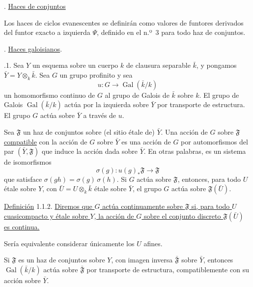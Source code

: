 \pageoriginale

\bigskip
{}. \underline{Haces de conjuntos}

Los haces de ciclos evanescentes se definirán como valores de funtores
derivados del funtor exacto a izquierda $\Psi$, definido en el n.º~3 para
todo haz de conjuntos.

\medskip
{}. \underline{Haces galoisianos}.

\medskip
{}.1. Sea $Y$ un esquema sobre un cuerpo $k$ de clausura separable
$\bar k$, y pongamos $\bar Y=Y\otimes_k\bar k$. Sea $G$ un grupo profinito y
sea
\begin{equation*}
u:G\longrightarrow\operatorname{Gal}(\bar k/k)
\end{equation*}
un homomorfismo continuo de $G$ al grupo de Galois de $\bar k$ sobre $k$. El
grupo de Galois $\operatorname{Gal}(\bar k/k)$ actúa por la izquierda sobre
$\bar Y$ por transporte de estructura. El grupo $G$ actúa sobre $\bar Y$ a
través de $u$.

Sea $\mathfrak F$ un haz de conjuntos sobre (el sitio étale de) $\bar Y$. Una
acción de $G$ sobre $\mathfrak F$ \underline{compatible} con la acción de $G$
sobre $\bar Y$ es una acción de $G$ por automorfismos del par
$(\bar Y,\mathfrak F)$ que induce la acción dada sobre $\bar Y$. En otras
palabras, es un sistema de isomorfismos
\begin{equation*}
\sigma(g):u(g)_*\mathfrak F\longrightarrow\mathfrak F
\end{equation*}
que satisface $\sigma(gh)=\sigma(g)\,\sigma(h)$. Si $G$ actúa sobre
$\mathfrak F$, entonces, para todo $U$ étale sobre $Y$, con
$\bar U=U\otimes_k\bar k$ étale sobre $\bar Y$, el grupo $G$ actúa sobre
$\mathfrak F(\bar U)$.

\medskip
\noindent\underline{Definición} 1.1.2.\quad
\underline{Diremos que $G$ actúa continuamente sobre $\mathfrak F$ si, para
todo $U$ cuasicompacto y étale sobre $Y$, la acción de $G$ sobre el conjunto
discreto $\mathfrak F(\bar U)$ es continua.}

Sería equivalente considerar únicamente los $U$ afines.

Si $\mathfrak F$ es un haz de conjuntos sobre $Y$, con imagen inversa
$\bar{\mathfrak F}$ sobre $\bar Y$, entonces
$\operatorname{Gal}(\bar k/k)$ actúa sobre $\bar{\mathfrak F}$ por transporte
de estructura, compatiblemente con su acción sobre $\bar Y$.

